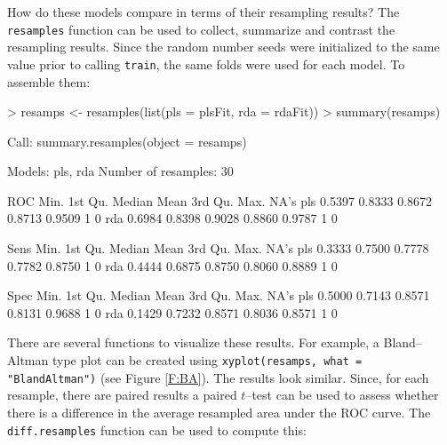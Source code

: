 \documentclass[12pt]{article}
\newcommand{\code}[1]{\mbox{\footnotesize\color{darkblue}\texttt{#1}}}
\renewenvironment{Schunk}{\vspace{\topsep}}{\vspace{\topsep}}
\begin{document}
\begin{Schunk}
\end{Schunk}

How do these models compare in terms of their resampling results? The \code{resamples} function can be used to collect, summarize and contrast the resampling results. Since the random number seeds were initialized to the same value prior to calling \code{train}, the same folds were used for each model. To assemble them:
\begin{Schunk}
\begin{Sinput}
> resamps <- resamples(list(pls = plsFit, rda = rdaFit))
> summary(resamps)
\end{Sinput}
\begin{Soutput}
Call:
summary.resamples(object = resamps)

Models: pls, rda 
Number of resamples: 30 

ROC 
      Min. 1st Qu. Median   Mean 3rd Qu. Max. NA's
pls 0.5397  0.8333 0.8672 0.8713  0.9509    1    0
rda 0.6984  0.8398 0.9028 0.8860  0.9787    1    0

Sens 
      Min. 1st Qu. Median   Mean 3rd Qu. Max. NA's
pls 0.3333  0.7500 0.7778 0.7782  0.8750    1    0
rda 0.4444  0.6875 0.8750 0.8060  0.8889    1    0

Spec 
      Min. 1st Qu. Median   Mean 3rd Qu. Max. NA's
pls 0.5000  0.7143 0.8571 0.8131  0.9688    1    0
rda 0.1429  0.7232 0.8571 0.8036  0.8571    1    0
\end{Soutput}
\end{Schunk}
There are several functions to visualize these results. For example, a Bland--Altman type plot can be created using \code{xyplot(resamps, what = "BlandAltman")} (see Figure \ref{F:BA}). The results look similar. Since, for each resample, there are paired results a paired $t$--test can be used to assess whether there is a difference in the average resampled area under the ROC curve. The \code{diff.resamples} function can be used to compute this:
\end{document}
